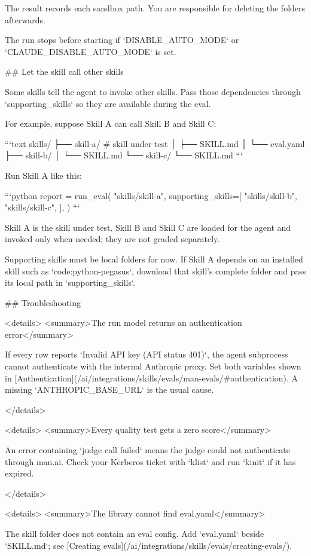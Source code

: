 The result records each sandbox path.
You are responsible for deleting the folders afterwards.

The run stops before starting if `DISABLE_AUTO_MODE` or `CLAUDE_DISABLE_AUTO_MODE` is set.

## Let the skill call other skills

Some skills tell the agent to invoke other skills.
Pass those dependencies through `supporting_skills` so they are available during the eval.

For example, suppose Skill A can call Skill B and Skill C:

```text
skills/
├── skill-a/                 # skill under test
│   ├── SKILL.md
│   └── eval.yaml
├── skill-b/
│   └── SKILL.md
└── skill-c/
    └── SKILL.md
```

Run Skill A like this:

```python
report = run_eval(
    "skills/skill-a",
    supporting_skills=[
        "skills/skill-b",
        "skills/skill-c",
    ],
)
```

Skill A is the skill under test.
Skill B and Skill C are loaded for the agent and invoked only when needed; they are not graded separately.

Supporting skills must be local folders for now.
If Skill A depends on an installed skill such as `code:python-pegasus`, download that skill's complete folder and pass its local path in `supporting_skills`.

## Troubleshooting

<details>
<summary>The run model returns an authentication error</summary>

If every row reports `Invalid API key (API status 401)`, the agent subprocess cannot authenticate with the internal Anthropic proxy.
Set both variables shown in [Authentication](/ai/integrations/skills/evals/man-evals/#authentication).
A missing `ANTHROPIC_BASE_URL` is the usual cause.

</details>

<details>
<summary>Every quality test gets a zero score</summary>

An error containing `judge call failed` means the judge could not authenticate through man.ai.
Check your Kerberos ticket with `klist` and run `kinit` if it has expired.

</details>

<details>
<summary>The library cannot find eval.yaml</summary>

The skill folder does not contain an eval config.
Add `eval.yaml` beside `SKILL.md`; see [Creating evals](/ai/integrations/skills/evals/creating-evals/).

